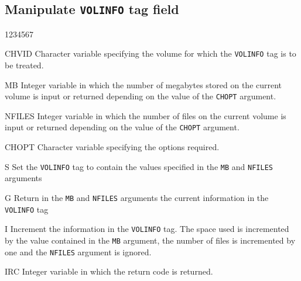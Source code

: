 \subsection{Manipulate {\tt VOLINFO} tag field}
\begin{DLtt}{1234567}
\item[CHVID]Character variable specifying the volume for
which the {\tt VOLINFO} tag is to be treated.
\item[MB]Integer variable in which the number of megabytes stored
on the current volume is input or returned depending
on the value of the {\tt CHOPT} argument.
\item[NFILES]Integer variable in which the number of
files on the current volume is input or returned depending
on the value of the {\tt CHOPT} argument.
\item[CHOPT]
Character variable specifying the options required.
\begin{DLtt}{12}
\item[S]Set the {\tt VOLINFO} tag to contain the values
specified in the {\tt MB} and {\tt NFILES} arguments
\item[G]Return in the {\tt MB} and {\tt NFILES} arguments
the current information in the {\tt VOLINFO} tag
\item[I]Increment the information in the {\tt VOLINFO} tag.
The space used is incremented by the value contained in the {\tt MB}
argument, the number of files is incremented by one
 and the {\tt NFILES} argument is ignored.
\end{DLtt}
\item[IRC]
Integer variable in which the return code is returned.
\end{DLtt}


